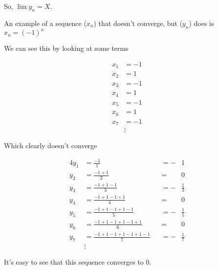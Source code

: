 \documentclass[12pt,letterpaper]{article}
\begin{document}
\begin{enumerate}
      So, $\lim y_n = X$.


      An example of a sequence ($x_n$) that doesn't converge, but ($y_n$) does is
      $x_n = (-1)^n$

      We can see this by looking at some terms

      \begin{align*}
        x_1 &= -1 \\
        x_2 &= 1 \\
        x_3 &= -1 \\
        x_4 &= 1 \\
        x_5 &= -1 \\
        x_6 &= 1 \\
        x_7 &= -1 \\
        &\vdots
      \end{align*}

      Which clearly doesn't converge

      \begin{alignat*}{4}
        y_1 &= \frac{-1}{1} &&= -&1 \\
        y_2 &= \frac{-1 + 1}{2} &&= & 0 \\
        y_3 &= \frac{-1 + 1 - 1}{3} &&= -&\frac{1}{3} \\
        y_4 &= \frac{-1 + 1 - 1 + 1}{4} &&= & 0 \\
        y_5 &= \frac{-1 + 1 - 1 + 1 - 1}{5} &&= -&\frac{1}{5} \\
        y_6 &= \frac{-1 + 1 - 1 + 1 - 1 + 1}{6} &&= & 0 \\
        y_7 &= \frac{-1 + 1 - 1 + 1 - 1 + 1 - 1}{7} &&= -&\frac{1}{7} \\
        &\vdots
      \end{alignat*}

      It's easy to see that this sequence converges to $0$.
  \end{enumerate}
\end{document}
